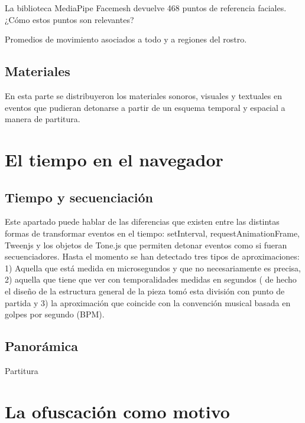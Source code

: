La biblioteca MediaPipe Facemesh devuelve 468 puntos de referencia faciales. ¿Cómo estos puntos son relevantes? 

Promedios de movimiento asociados a todo y a regiones del rostro. 

\subsection{Materiales}


En esta parte se distribuyeron los materiales sonoros, visuales y textuales en eventos que pudieran detonarse a partir de un esquema temporal y espacial a manera de partitura. 

\section{El tiempo en el navegador}

\subsection{Tiempo y secuenciación}

Este apartado puede hablar de las diferencias que existen entre las distintas formas de transformar eventos en el tiempo: setInterval, requestAnimationFrame, Tweenjs y los objetos de Tone.js que permiten detonar eventos como si fueran secuenciadores. Hasta el momento se han detectado tres tipos de aproximaciones: 1) Aquella que está medida en microsegundos y que no necesariamente es precisa, 2) aquella que tiene que ver con temporalidades medidas en segundos ( de hecho el diseño de la estructura general de la pieza tomó esta división con punto de partida y 3) la aproximación que coincide con la convención musical basada en golpes por segundo (BPM). 

\subsection{Panorámica}

Partitura

\section{La ofuscación como motivo}

